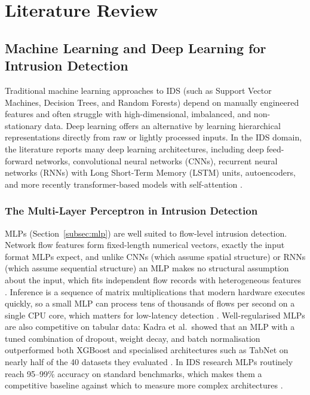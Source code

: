 \section{Literature Review}
\label{sec:literature_review}

\subsection{Machine Learning and Deep Learning for Intrusion Detection}
\label{sec:dl_ids}

\par Traditional machine learning approaches to IDS (such as Support Vector Machines, Decision Trees, and Random Forests) depend on manually engineered features and often struggle with high-dimensional, imbalanced, and non-stationary data. Deep learning offers an alternative by learning hierarchical representations directly from raw or lightly processed inputs. In the IDS domain, the literature reports many deep learning architectures, including deep feed-forward networks, convolutional neural networks (CNNs), recurrent neural networks (RNNs) with Long Short-Term Memory (LSTM) units, autoencoders, and more recently transformer-based models with self-attention \cite{Lansky2021}.

\subsubsection{The Multi-Layer Perceptron in Intrusion Detection}
\label{subsec:mlp_in_ids}

\par MLPs (Section~\ref{subsec:mlp}) are well suited to flow-level intrusion detection. Network flow features form fixed-length numerical vectors, exactly the input format MLPs expect, and unlike CNNs (which assume spatial structure) or RNNs (which assume sequential structure) an MLP makes no structural assumption about the input, which fits independent flow records with heterogeneous features \cite{Kadra2021}. Inference is a sequence of matrix multiplications that modern hardware executes quickly, so a small MLP can process tens of thousands of flows per second on a single CPU core, which matters for low-latency detection \cite{Vinayakumar2019}. Well-regularised MLPs are also competitive on tabular data: Kadra et al.\ showed that an MLP with a tuned combination of dropout, weight decay, and batch normalisation outperformed both XGBoost and specialised architectures such as TabNet on nearly half of the 40 datasets they evaluated \cite{Kadra2021}. In IDS research MLPs routinely reach 95--99\% accuracy on standard benchmarks, which makes them a competitive baseline against which to measure more complex architectures \cite{Vinayakumar2019, Ferrag2020}.

